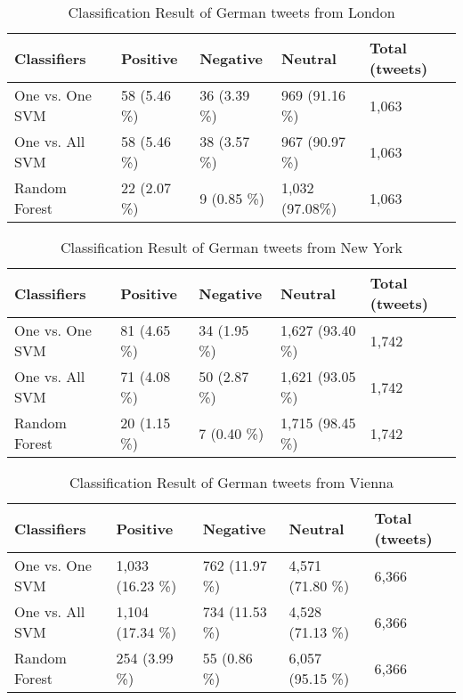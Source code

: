 \begin{table}[ht]
	\caption{Classification Result of German tweets from London}
	\begin{tabular}{|l|p{1.8cm}|p{1.8cm}|p{1.8cm}|p{1.8cm}|} \hline
	Classifiers & Positive & Negative & Neutral & Total (tweets)\\ \hline
	
One vs. One SVM & 58 (5.46 \%)& 36 (3.39 \%)& 969 (91.16 \%) & 1,063 \\ \hline
One vs. All SVM & 58 (5.46 \%)& 38 (3.57 \%)& 967  (90.97 \%)& 1,063 \\ \hline
Random Forest   & 22 (2.07 \%)& 9 (0.85 \%) & 1,032 (97.08\%)& 1,063 \\ \hline

	\end{tabular}
	\label{tab:result_london_de}
\end{table}

\begin{table}[ht]
	\caption{Classification Result of German tweets from New York}
	\begin{tabular}{|l|p{1.8cm}|p{1.8cm}|p{1.8cm}|p{1.8cm}|} \hline
	Classifiers & Positive & Negative & Neutral & Total (tweets)\\ \hline
One vs. One SVM & 81 (4.65 \%)& 34 (1.95 \%)& 1,627 (93.40 \%)& 1,742 \\ \hline
One vs. All SVM & 71 (4.08 \%)& 50 (2.87 \%)& 1,621 (93.05 \%)& 1,742 \\ \hline
Random Forest   & 20 (1.15 \%)& 7  (0.40 \%)& 1,715 (98.45 \%)& 1,742 \\ \hline

	\end{tabular}
	\label{tab:result_ny_de}
\end{table}


\begin{table}[ht]
	\caption{Classification Result of German tweets from Vienna}
	\begin{tabular}{|l|p{1.8cm}|p{1.8cm}|p{1.8cm}|p{1.8cm}|} \hline
	Classifiers & Positive & Negative & Neutral & Total (tweets)\\ \hline
	
	One vs. One SVM & 1,033 (16.23 \%)& 762 (11.97 \%)& 4,571 (71.80 \%)& 6,366 \\ \hline
	One vs. All SVM & 1,104 (17.34 \%)& 734 (11.53 \%)& 4,528 (71.13 \%)& 6,366 \\ \hline
	Random Forest   & 254 (3.99 \%) & 55 (0.86 \%) & 6,057 (95.15 \%)& 6,366 \\ \hline
	\end{tabular}
	\label{tab:result_vienna_de}
\end{table}

